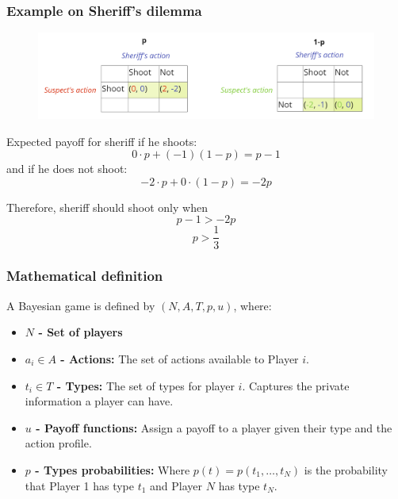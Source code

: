 \documentclass[11pt]{beamer}
\begin{document}
\begin{frame}
    \frametitle{Example on Sheriff's dilemma}

    
    \begin{figure}
        \centering
        \includegraphics[width=1.0\textwidth]{assets/sheriff3.png}
    \end{figure}

    \vspace{5mm}

    Expected payoff for sheriff if he shoots:
    $$0 \cdot p + (-1)(1-p) = p - 1$$
    and if he does not shoot:
    $$-2 \cdot p + 0 \cdot (1-p) = -2p$$

    Therefore, sheriff should shoot only when 
    $$ p-1 > -2p $$
    $$ p > \frac{1}{3} $$
    
\end{frame} 



\begin{frame}
    \frametitle{Mathematical definition}

    A Bayesian game is defined by $(N,A,T,p,u)$, where:
    
    \vspace{5mm}
    \begin{itemize}
        \item \textbf{$N$ - Set of players}
        \vspace{2mm}
        \item \textbf{$a_i \in A$ - Actions:} The set of actions available to Player $i$.
        \vspace{2mm}
        \item \textbf{$t_i \in T$ - Types:} The set of types for player $i$. Captures the private information a player can have.
        \vspace{2mm}
        \item \textbf{$u$ - Payoff functions:} Assign a payoff to a player given their type and the action profile.
        \vspace{2mm}
        \item \textbf{$p$ - Types probabilities:} Where $p(t) = p(t_1, \ldots, t_N)$ is the probability that Player 1 has type $t_1$ and Player $N$ has type $t_N$.
    \end{itemize}

\end{frame}
\end{document}

